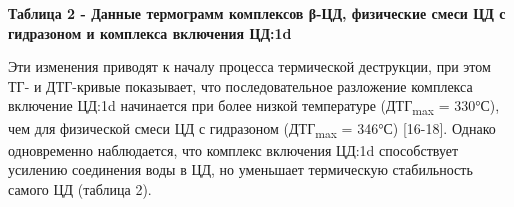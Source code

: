 {\bfseries Таблица 2 - Данные термограмм комплексов β-ЦД, физические смеси
ЦД с гидразоном и комплекса включения ЦД:1d}


Эти изменения приводят к началу процесса термической деструкции, при
этом ТГ- и ДТГ-кривые показывает, что последовательное разложение
комплекса включение ЦД:1d начинается при более низкой температуре
(ДТГ\textsubscript{max} = 330°С), чем для физической смеси ЦД с
гидразоном (ДТГ\textsubscript{max} = 346°С) {[}16-18{]}. Однако
одновременно наблюдается, что комплекс включения ЦД:1d способствует
усилению соединения воды в ЦД, но уменьшает термическую стабильность
самого ЦД (таблица 2).


